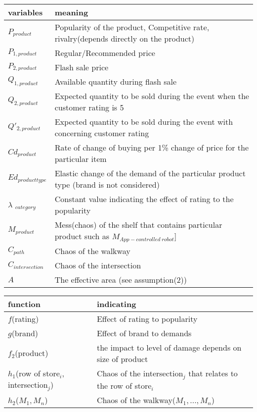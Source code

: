 \begin{tabular}{ | p{30mm} | p{130mm} | }
    \hline
    variables & meaning  \\\hline
    $P_{product}$ & Popularity of the product, Competitive rate, rivalry(depends directly on the product)\\\hline
    $P_{1,product}$ & Regular/Recommended price \\\hline
    $P_{2,product}$ & Flash sale price \\\hline
    $Q_{1,product}$ & Available quantity during flash sale  \\\hline
    $Q_{2,product}$ & Expected quantity to be sold during the event when the customer rating is 5\\\hline
    $Q'_{2,product}$ & Expected quantity to be sold during the event with concerning customer rating \\\hline
    $Cd_{product}$ & Rate of change of buying per 1\% change of price for the particular item \\\hline
    $Ed_{product type}$ & Elastic change of the demand of the particular product type (brand is not considered)\\\hline
    $\lambda$ $_{category}$ & Constant value indicating the effect of rating to the popularity \\\hline
    $M_{product}$ & Mess(chaos) of the shelf that contains particular product such as $M_{App-controlled\ robot}$] \\\hline
    $C_{path}$ & Chaos of the walkway\\\hline
    $C_{intersection}$ & Chaos of the intersection\\\hline
    $A$ & The effective area (see assumption(2))\\\hline


\end{tabular}
\newline
\newline
\newline
\noindent
\begin{tabular}{ | p{30mm} | p{130mm} | }
    \hline
    function & indicating  \\\hline
    $f$(rating) & Effect of rating to popularity \\\hline
    $g$(brand) & Effect of brand to demands \\\hline
    $f_2$(product) & the impact to level of damage depends on size of product \\\hline
    $h_1$(row of store$_i$, intersection$_j$) & Chaos of the intersection$_j$ that relates to the row of store$_i$ \\\hline
$h_2$($M_1,M_n$) & Chaos of the walkway($M_1,...,M_n$) \\\hline
\end{tabular}

